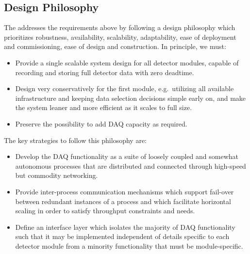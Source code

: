 
\subsection{Design Philosophy}

The    addresses the requirements above by following a
design philosophy which prioritizes robustness, availability,
scalability, adaptability, ease of
deployment and commissioning, ease of design and construction. In
principle, we must:
\begin{itemize}
\item Provide a single scalable system design for all detector
  modules, capable of recording and storing full detector data with
  zero deadtime.
\item Design very conservatively for the first module, e.g.~utilizing
  all available infrastructure and keeping data selection decisions
  simple early on, and make the system leaner and more efficient as it
  scales to full size.
\item Preserve the possibility to add DAQ capacity as required.
\end{itemize}

The key strategies to follow this philosophy are:
\begin{itemize}
\item Develop the DAQ functionality as a suite of loosely coupled and somewhat autonomous processes that are distributed and connected through high-speed but commodity networking.
\item Provide inter-process communication mechanisms which support
  fail-over between redundant instances of a process and which
  facilitate horizontal scaling in order to satisfy throughput
  constraints and needs.
\item Define an interface layer which isolates the majority of DAQ functionality such that it may be implemented independent of details specific to each detector module from a minority functionality that must be module-specific.
\end{itemize}

